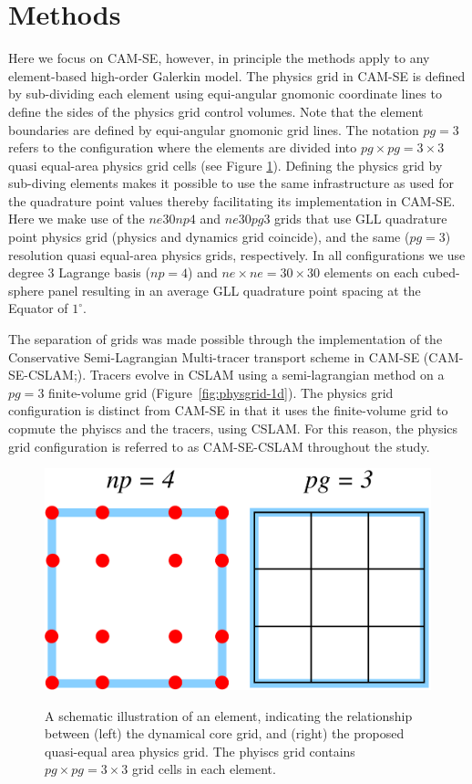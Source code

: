 \documentclass[twocol]{ametsoc}
\begin{document}
\section{Methods}
Here we focus on CAM-SE, however, in principle the methods apply to any element-based high-order Galerkin model. The physics grid in CAM-SE is defined by sub-dividing each element using equi-angular gnomonic coordinate lines to define the sides of the physics grid control volumes. Note that the element boundaries are defined by equi-angular gnomonic grid lines. The notation $pg=3$ refers to the configuration where the elements are divided into $pg\times pg=3\times 3$ quasi equal-area physics grid cells (see Figure \ref{fig:np4_pg3}). Defining the physics grid by sub-diving elements makes it possible to use the same infrastructure as used for the quadrature point values thereby facilitating its implementation in CAM-SE. Here we make use of the $ne30np4$ and $ne30pg3$ grids that use GLL quadrature point physics grid (physics and dynamics grid coincide), and the same ($pg=3$) resolution quasi equal-area physics grids, respectively. In all configurations we use degree 3 Lagrange basis ($np=4$) and $ne\times ne=30\times 30$ elements on each cubed-sphere panel resulting in an average GLL quadrature point spacing at the Equator of $1^\circ$. %

The separation of grids was made possible through the implementation of the Conservative Semi-Lagrangian Multi-tracer transport scheme in CAM-SE (CAM-SE-CSLAM;\cite{LTOUNGK2017MWR}). Tracers evolve in CSLAM using a semi-lagrangian method on a $pg=3$ finite-volume grid (Figure~\ref{fig:physgrid-1d}). The physics grid configuration is distinct from CAM-SE in that it uses the finite-volume grid to copmute the phyiscs and the tracers, using CSLAM. For this reason, the physics grid configuration is referred to as CAM-SE-CSLAM throughout the study.

\begin{figure}[t]
\noindent\includegraphics[width=38pc,angle=0]{figs/np4_pg3.pdf}\\
\caption{A schematic illustration of an element, indicating the relationship between (left) the dynamical core grid, and (right) the proposed quasi-equal area physics grid. The phyiscs grid contains $pg\times pg=3\times 3$ grid cells in each element.}
\label{fig:np4_pg3}
\end{figure}
\end{document}
